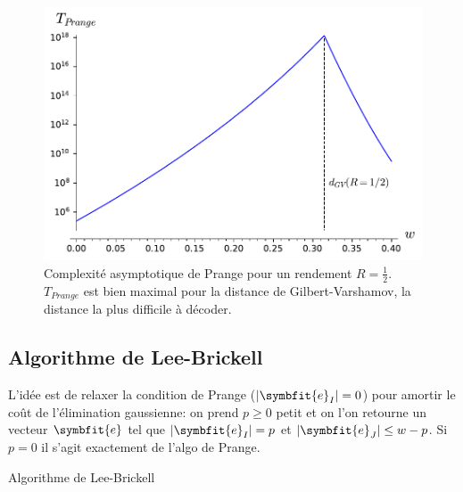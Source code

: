\documentclass{scrartcl}[a4paper,9pt,headings=small,footinclude=false]
\theoremstyle{definition}
\theoremstyle{remark}
\begin{document}
\begin{figure}[h]
\centering
\includegraphics{decodage_syndrome/prange.pdf}
\caption{Complexité asymptotique de Prange pour un rendement $R=\frac{1}{2}$. $T_{Prange}$ est bien maximal pour la distance de Gilbert-Varshamov, la distance la plus difficile à décoder.}
\label{fig:prange}
\end{figure}


\subsection{Algorithme de Lee-Brickell}

L'idée est de relaxer la condition de Prange ($|\symbfit{e}_I|=0$) pour amortir le coût de l'élimination gaussienne: on prend $p\geq 0$ petit et on l'on retourne un vecteur $\symbfit{e}$ tel que $|\symbfit{e}_I|=p$ et $|\symbfit{e}_J|\leq w-p$. Si $p=0$ il s'agit exactement de l'algo de Prange.

\begin{algorithm}[H]
    \renewcommand{\algorithmcfname}{Algorithme}%
    \SetAlgoLined
\caption{Algorithme de Lee-Brickell}
\end{algorithm}
\end{document}
